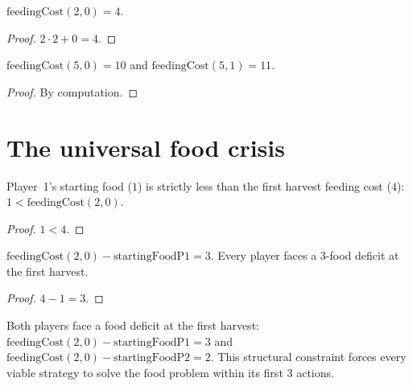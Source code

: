 \begin{theorem}
  \label{thm:two_dwarf_feed}
  \leanok
  $\text{feedingCost}(2, 0) = 4$.
\end{theorem}

\begin{proof}\leanok $2 \cdot 2 + 0 = 4$.\end{proof}

\begin{theorem}
  \label{thm:five_dwarf_feed}
  \leanok
  $\text{feedingCost}(5, 0) = 10$ and $\text{feedingCost}(5, 1) = 11$.
\end{theorem}

\begin{proof}\leanok By computation.\end{proof}

\section{The universal food crisis}

\begin{theorem}
  \label{thm:food_insufficient}
  \leanok
  Player~1's starting food ($1$) is strictly less than the first
  harvest feeding cost ($4$): $1 < \text{feedingCost}(2, 0)$.
\end{theorem}

\begin{proof}\leanok $1 < 4$.\end{proof}

\begin{theorem}
  \label{thm:first_deficit}
  \leanok
  $\text{feedingCost}(2,0) - \text{startingFoodP1} = 3$.
  Every player faces a 3-food deficit at the first harvest.
\end{theorem}

\begin{proof}\leanok $4 - 1 = 3$.\end{proof}

\begin{theorem}
  \label{thm:universal_food_crisis}
  \leanok
  Both players face a food deficit at the first harvest:
  $\text{feedingCost}(2,0) - \text{startingFoodP1} = 3$ and
  $\text{feedingCost}(2,0) - \text{startingFoodP2} = 2$.
  This structural constraint forces every viable strategy to
  solve the food problem within its first $3$ actions.
\end{theorem}

